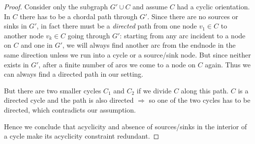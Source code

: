 \begin{proof}
 Consider only the subgraph $G'\cup C$ and assume $C$ had a cyclic orientation. In $C$ there has to be a chordal path 
through $G'$. Since there are no sources or sinks in $G'$, in fact there must be a \textit{directed} path from one node 
$v_1 \in C$ to another node $v_k\in C$ going through $G'$: starting from any arc incident to a node on $C$ and one in 
$G'$, we will always find another arc from the endnode in the same direction unless we run into a cycle or a 
source/sink node. But since neither exists in $G'$, after a finite number of arcs we come to a node on $C$ again. Thus 
we can always find a directed path in our setting. 

But there are two smaller cycles $C_1$ and $C_2$ if we divide $C$ along this path. $C$ is a directed cycle and the path 
is also directed $\Rightarrow$ so one of the two cycles has to be directed, which contradicts our assumption. 
\Lightning 

Hence we conclude that acyclicity and absence of sources/sinks in the interior of a cycle make its acyclicity 
constraint redundant.
\end{proof}

